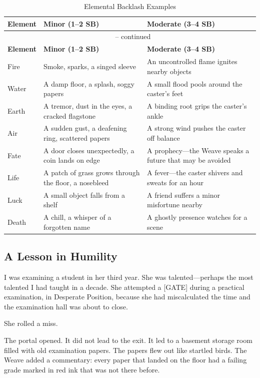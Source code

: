\begin{longtable}{p{} p{} p{}}
\caption{Elemental Backlash Examples}\\
\midrule
\textbf{Element} & \textbf{Minor (1--2 SB)} & \textbf{Moderate (3--4 SB)}\\
\midrule
\endfirsthead
\multicolumn{3}{c}{\tablename\ \thetable{} -- continued}\\
\midrule
\textbf{Element} & \textbf{Minor (1--2 SB)} & \textbf{Moderate (3--4 SB)}\\
\midrule
\endhead
Fire & Smoke, sparks, a singed sleeve & An uncontrolled flame ignites nearby objects \\
Water & A damp floor, a splash, soggy papers & A small flood pools around the caster's feet \\
Earth & A tremor, dust in the eyes, a cracked flagstone & A binding root grips the caster's ankle \\
Air & A sudden gust, a deafening ring, scattered papers & A strong wind pushes the caster off balance \\
Fate & A door closes unexpectedly, a coin lands on edge & A prophecy---the Weave speaks a future that may be avoided \\
Life & A patch of grass grows through the floor, a nosebleed & A fever---the caster shivers and sweats for an hour \\
Luck & A small object falls from a shelf & A friend suffers a minor misfortune nearby \\
Death & A chill, a whisper of a forgotten name & A ghostly presence watches for a scene \\
\hline
\end{longtable}

\subsection{A Lesson in Humility}

I was examining a student in her third year. She was talented---perhaps the most talented I had taught in a decade. She attempted a [GATE] during a practical examination, in Desperate Position, because she had miscalculated the time and the examination hall was about to close.

She rolled a miss.

The portal opened. It did not lead to the exit. It led to a basement storage room filled with old examination papers. The papers flew out like startled birds. The Weave added a commentary: every paper that landed on the floor had a failing grade marked in red ink that was not there before.

